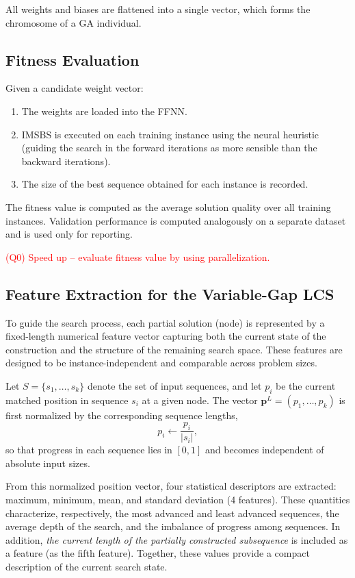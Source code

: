 \documentclass[11pt,a4paper]{article}
\begin{document}
All weights and biases are flattened into a single vector, which forms the chromosome of a GA individual.

\subsection{Fitness Evaluation}

Given a candidate weight vector:
\begin{enumerate}
    \item The weights are loaded into the FFNN.
    \item IMSBS is executed on each training instance using the neural heuristic (guiding the search in the forward iterations as more sensible than the backward iterations).
    \item The size of the best sequence obtained for each instance is recorded.
\end{enumerate}

The fitness value is computed as the average solution quality over all training instances. Validation performance is computed analogously on a separate dataset and is used only for reporting.

\textcolor{red}{(Q0) Speed up -- evaluate fitness value by using parallelization. }

\subsection{Feature Extraction for the Variable-Gap LCS}

To guide the search process, each partial solution (node) is represented by a fixed-length numerical feature vector capturing both the current state of the construction and the structure of the remaining search space. These features are designed to be instance-independent and comparable across problem sizes.

Let $S=\{s_1,\ldots, s_k\}$ denote the set of input sequences, and let $p_i$ be the current matched position in sequence $s_i$ at a given node. The vector $\mathbf{p}^L=(p_1,\ldots,p_k)$ is first normalized by the corresponding sequence lengths,
\[
p_i \leftarrow \frac{p_i}{|s_i|},
\]
so that progress in each sequence lies in $[0,1]$ and becomes independent of absolute input sizes.

From this normalized position vector, four statistical descriptors are extracted: maximum, minimum, mean, and standard deviation (4 features). These quantities characterize, respectively, the most advanced and least advanced sequences, the average depth of the search, and the imbalance of progress among sequences. In addition, \textit{the current length of the partially constructed subsequence} is included as a feature (as the fifth feature). Together, these values provide a compact description of the current search state.
\end{document}
